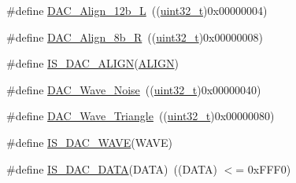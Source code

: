 \begin{DoxyCompactItemize}
\item 
\#define \hyperlink{group___d_a_c__data__alignment_gaf3a46d37092eac0d4c9c1039e68208d4}{D\+A\+C\+\_\+\+Align\+\_\+12b\+\_\+L}~((\hyperlink{_p_e___types_8h_a33594304e786b158f3fb30289278f5af}{uint32\+\_\+t})0x00000004)
\item 
\#define \hyperlink{group___d_a_c__data__alignment_gaa633fbcf85e97e12c4894eaed530dd8f}{D\+A\+C\+\_\+\+Align\+\_\+8b\+\_\+R}~((\hyperlink{_p_e___types_8h_a33594304e786b158f3fb30289278f5af}{uint32\+\_\+t})0x00000008)
\item 
\#define \hyperlink{group___d_a_c__data__alignment_ga7779c36606827a6a2c4423414a441bde}{I\+S\+\_\+\+D\+A\+C\+\_\+\+A\+L\+I\+GN}(\hyperlink{usb__devapi_8h_ae4ff5a07c6ff43ed11a3887ef7d524f2}{A\+L\+I\+GN})
\item 
\#define \hyperlink{group___d_a_c__wave__generation_ga09c5ee68f8e726b1c039df1f6e195965}{D\+A\+C\+\_\+\+Wave\+\_\+\+Noise}~((\hyperlink{_p_e___types_8h_a33594304e786b158f3fb30289278f5af}{uint32\+\_\+t})0x00000040)
\item 
\#define \hyperlink{group___d_a_c__wave__generation_ga95a1566e1728e1e345e8f3b50629a075}{D\+A\+C\+\_\+\+Wave\+\_\+\+Triangle}~((\hyperlink{_p_e___types_8h_a33594304e786b158f3fb30289278f5af}{uint32\+\_\+t})0x00000080)
\item 
\#define \hyperlink{group___d_a_c__wave__generation_ga45c25065fb713820f6dbae0009376e1c}{I\+S\+\_\+\+D\+A\+C\+\_\+\+W\+A\+VE}(W\+A\+VE)
\item 
\#define \hyperlink{group___d_a_c__data_ga903e28d4971e172b37c1c2fc17c2a884}{I\+S\+\_\+\+D\+A\+C\+\_\+\+D\+A\+TA}(D\+A\+TA)~((D\+A\+TA) $<$= 0x\+F\+F\+F0)
\end{DoxyCompactItemize}
